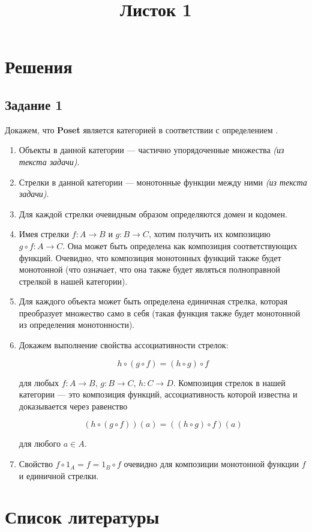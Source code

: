 \title{Листок 1}

\section{Решения}

\subsection{Задание 1}

Докажем, что \textbf{Poset} является категорией в соответствии с определением
\cite{awodey.category-theory/category-definition}.

\begin{enumerate}
    \item Объекты в данной категории — частично упорядоченные множества
        \textit{(из текста задачи)}.
    \item Стрелки в данной категории — монотонные функции между ними
        \textit{(из текста задачи)}.
    \item Для каждой стрелки очевидным образом определяются домен и кодомен.
    \item Имея стрелки $f : A \rightarrow B$ и $g : B → C$, хотим получить их
        композицию $g \circ f : A → C$. Она может быть определена как композиция
        соответствующих функций. Очевидно, что композиция монотонных функций
        также будет монотонной (что означает, что она также будет являться
        полноправной стрелкой в нашей категории).
    \item Для каждого объекта может быть определена единичная стрелка, которая
        преобразует множество само в себя (такая функция также будет монотонной
        из определения монотонности).
    \item Докажем выполнение свойства ассоциативности стрелок:

        $$ h \circ (g \circ f) = (h \circ g) \circ f $$

        для любых $f : A → B$, $g : B → C$, $h : C → D$. Композиция стрелок в
        нашей категории — это композиция функций, ассоциативность которой
        известна и доказывается через равенство

        $$ (h \circ (g \circ f))(a) = ((h \circ g) \circ f)(a) $$

        для любого $a \in A$.
    \item Свойство $f \circ 1_A = f = 1_B \circ f$ очевидно для композиции
        монотонной функции $f$ и единичной стрелки.
\end{enumerate}

\section{Список литературы}

